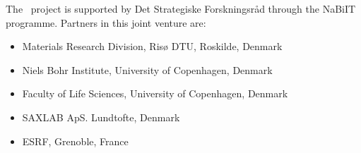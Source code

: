 The \MCX\ project is supported by Det Strategiske Forskningsråd through the NaBiIT programme. Partners in this joint venture are: 
\begin{itemize}
\item Materials Research Division, Risø DTU, Roskilde, Denmark\\
\item Niels Bohr Institute, University of Copenhagen, Denmark\\
\item Faculty of Life Sciences, University of Copenhagen, Denmark\\
\item SAXLAB ApS. Lundtofte, Denmark\\
\item ESRF, Grenoble, France
\end{itemize}
